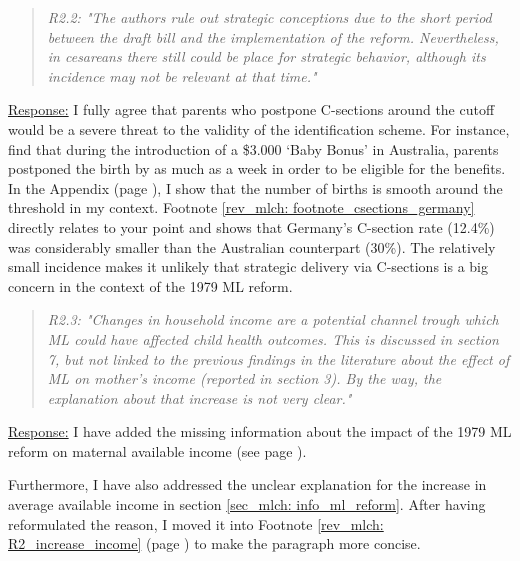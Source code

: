 \bigskip
{}
\begin{quote}
	\textit{R2.2: "The authors rule out strategic conceptions due to the short period between the draft bill and the implementation of the reform. Nevertheless, in cesareans there still could be place for strategic behavior, although its incidence may not be relevant at that time."}
\end{quote}
\underline{Response:} I fully agree that parents who postpone C-sections around the cutoff would be a severe threat to the validity of the identification scheme. For instance, \cite{gans2009born} find that during the introduction of a \$3.000 `Baby Bonus' in Australia, parents postponed the birth by as much as a week in order to be eligible for the benefits. In the Appendix (page \pageref{sec_mlch:empirical_strategy_threats+validity}), I show that the number of births is smooth around the threshold in my context. Footnote \ref{rev_mlch: footnote_csections_germany} directly relates to your point and shows that Germany's C-section rate (12.4\%) was considerably smaller than the Australian counterpart (30\%). The relatively small incidence makes it unlikely that strategic delivery via C-sections is a big concern in the context of the 1979 ML reform.

 


\bigskip
{}
\begin{quote}
	\textit{R2.3: "Changes in household income are a potential channel trough which ML could have affected child health outcomes. This is discussed in section 7, but not linked to the previous findings in the literature about the effect of ML on mother's income (reported in section 3). By the way, the explanation about that increase is not very clear."}
\end{quote}
\underline{Response:}  I have added the missing information about the impact of the 1979 ML reform on maternal available income (see page \pageref{rev_mlch: r2_maternal_income_missing_link}). 

Furthermore, I have also addressed the unclear explanation for the increase in average available income in section \ref{sec_mlch: info_ml_reform}. After having reformulated the reason, I moved it into Footnote \ref{rev_mlch: R2_increase_income} (page \pageref{rev_mlch: R2_increase_income}) to make the paragraph more concise. 


